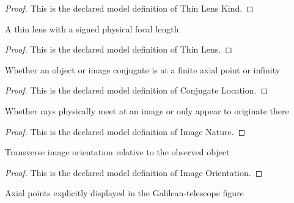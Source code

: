 \begin{proof}
  This is the declared model definition of Thin Lens Kind.
\end{proof}
\begin{definition}
  \label{def:physics:phyx-mini-0111:phyxminiproblems-problemphyxmini0111-thinlens}
  A thin lens with a signed physical focal length
\end{definition}
\begin{proof}
  This is the declared model definition of Thin Lens.
\end{proof}
\begin{definition}
  \label{def:physics:phyx-mini-0111:phyxminiproblems-problemphyxmini0111-conjugatelocation}
  Whether an object or image conjugate is at a finite axial point or infinity
\end{definition}
\begin{proof}
  This is the declared model definition of Conjugate Location.
\end{proof}
\begin{definition}
  \label{def:physics:phyx-mini-0111:phyxminiproblems-problemphyxmini0111-imagenature}
  Whether rays physically meet at an image or only appear to originate there
\end{definition}
\begin{proof}
  This is the declared model definition of Image Nature.
\end{proof}
\begin{definition}
  \label{def:physics:phyx-mini-0111:phyxminiproblems-problemphyxmini0111-imageorientation}
  Transverse image orientation relative to the observed object
\end{definition}
\begin{proof}
  This is the declared model definition of Image Orientation.
\end{proof}
\begin{definition}
  \label{def:physics:phyx-mini-0111:phyxminiproblems-problemphyxmini0111-axialfigurepoint}
  Axial points explicitly displayed in the Galilean-telescope figure
\end{definition}
